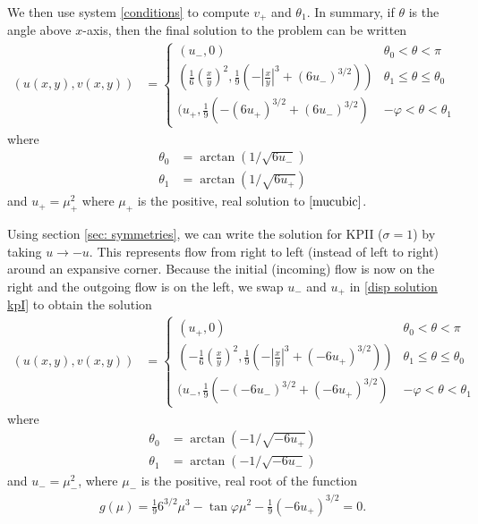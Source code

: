 \documentclass[12pt]{article}
\numberwithin{equation}{section}
\begin{document}
We then use system \ref{conditions} to compute $v_+$ and $\theta_1$. In summary, if $\theta$ is the angle above $x$-axis, then the final solution to the problem can be written
\begin{align}
    (u(x,y),v(x,y)) &= \left\{
    \begin{array}{rl}
        \left(u_-,0\right) & \theta_0<\theta<\pi \\
        \left(\frac{1}{6}\left(\frac{x}{y}\right)^2,\frac{1}{9}\left(-\left|\frac{x}{y}\right|^3+(6u_-)^{3/2}\right)\right) & \theta_1 \leq \theta \leq \theta_0 \\
        (u_+,\frac{1}{9}(-(6u_+)^{3/2}+(6u_-)^{3/2}) & -\varphi <\theta<\theta_1
    \end{array}\right.
\end{align} \label{disp solution kpI}
where 
\begin{subequations}
    \begin{align}
        \theta_0 &= \arctan(1/\sqrt{6u_-}) \\
        \theta_1 &= \arctan(1/\sqrt{6u_+})
    \end{align}
\end{subequations}
and $u_+=\mu_+^2$ where $\mu_+$ is the positive, real solution to $\eqref{mucubic}$.

Using section \ref{sec: symmetries}, we can write the solution for KPII ($\sigma = 1$) by taking $u \to -u$. This represents flow from right to left (instead of left to right) around an expansive corner. Because the initial (incoming) flow is now on the right and the outgoing flow is on the left, we swap $u_-$ and $u_+$ in \eqref{disp solution kpI} to obtain the solution
\begin{align}
    (u(x,y),v(x,y)) &= \left\{
    \begin{array}{rl}
        \left(u_+,0\right) & \theta_0<\theta<\pi \\
        \left(-\frac{1}{6}\left(\frac{x}{y}\right)^2,\frac{1}{9}\left(-\left|\frac{x}{y}\right|^3+(-6u_+)^{3/2}\right)\right) & \theta_1 \leq \theta \leq \theta_0 \\
        (u_-,\frac{1}{9}(-(-6u_-)^{3/2}+(-6u_+)^{3/2}) & -\varphi <\theta<\theta_1
    \end{array}\right.
\end{align}
where 
\begin{subequations}
    \begin{align}
        \theta_0 &= \arctan(-1/\sqrt{-6u_+}) \\
        \theta_1 &= \arctan(-1/\sqrt{-6u_-})
    \end{align}
\end{subequations}
and $u_- = \mu_-^2$, where $\mu_-$ is the positive, real root of the function
\begin{align}
    g(\mu)=\frac{1}{9}6^{3/2}\mu^3 - \tan \varphi \mu^2 - \frac{1}{9}(-6u_+)^{3/2} = 0. \label{mucubic_kp2}
\end{align}
\end{document}
